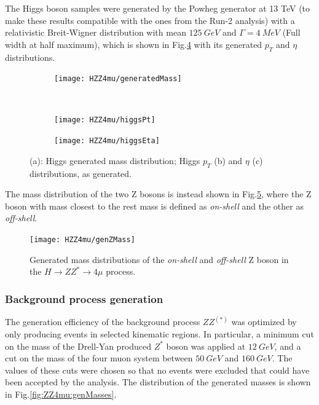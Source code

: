 \documentclass[a4paper,twoside,12pt]{article}
\begin{document}
The Higgs boson samples were generated by the Powheg generator at 13 TeV (to make these results compatible with the ones from the
Run-2 analysis) with a 
relativistic Breit-Wigner distribution with mean $125\ GeV$ and $\Gamma = 4\ MeV$ (Full
width at half maximum), which 
is shown in Fig.\ref{fig:HZZ4mu:generatedHiggs} with its generated $p_T$ and $\eta$ distributions.\\

\begin{figure}
\begin{subfigure}{.5\linewidth}
\texttt{[image: HZZ4mu/generatedMass]}
\caption{}
\label{fig:HZZ4mu:generatedHiggs}
\end{subfigure}\\[1ex]
\begin{subfigure}{.5\linewidth}
\centering
\texttt{[image: HZZ4mu/higgsPt]}
\caption{}
\label{fig:HZZ4mu:higgsPt}
\end{subfigure}
\begin{subfigure}{.5\linewidth}
\centering
\texttt{[image: HZZ4mu/higgsEta]}
\caption{}
\label{fig:HZZ4mu:higgsEta}
\end{subfigure}
\caption{(a): Higgs generated mass distribution;	Higgs $p_{T}$ (b) and $\eta$ (c) distributions, as generated.}
\label{fig:HZZ4mu:generatedHiggs}
\end{figure}

The mass distribution of the two Z bosons is instead shown in Fig.\ref{fig:HZZ4mu:generatedZMass}, where the Z boson with mass closest to the rest mass
is defined as \textit{on-shell} and the other as \textit{off-shell}.

\begin{figure}
\centering
  \texttt{[image: HZZ4mu/genZMass]}
  \caption{Generated mass distributions of the \textit{on-shell} and \textit{off-shell} Z boson 
  in the $H \rightarrow ZZ^* \rightarrow 4\mu$ process.}
\label{fig:HZZ4mu:generatedZMass}
\end{figure}

\subsubsection{Background process generation}\label{physics:bkgGeneration}
The generation efficiency of the background process $ZZ^{(*)}$ was optimized by only
producing events in selected kinematic regions. In particular, a minimum cut on the mass of
the Drell-Yan produced $Z^*$ boson was applied at $12\ GeV$, and a cut on the mass of the four muon
system between $50\ GeV$ and $160\ GeV$. The values of these cuts were chosen so that no events were excluded that could
have been accepted by the analysis. The distribution of the generated masses is shown 
in Fig.\ref{fig:ZZ4mu:genMasses}.\\
\end{document}
